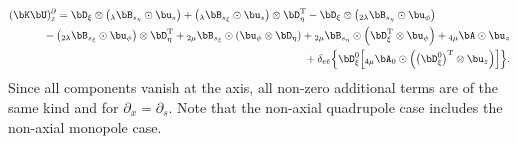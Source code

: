 %
\begin{eqnarray}
\lefteqn{(\bK\bU)_z^{\partial} =
\bD_\xi\otimes\left({}_{\lambda}\bB_{s_\eta}\odot{\bu_s}\right)+
\left({}_{\lambda}\bB_{s_\xi}\odot{\bu_s}\right)\otimes\bD^{\rm{T}}_\eta-
\bD_\xi\otimes\left({}_{2\lambda}\bB_{s_\eta}\odot{\bu_\phi}\right)}
\nonumber\\&&\mbox{}\hspace{2.2em}
-\left({}_{2\lambda}\bB_{s_\xi}\odot{\bu_\phi}\right)\otimes\bD^{\rm{T}}_\eta
+{}_{2\mu}\bB_{s_\xi}\odot\left(\bu_\phi\otimes\bD_\eta\right)+
{}_{2\mu}\bB_{s_\eta}\odot\left(\bD^{\rm{T}}_\xi\otimes \bu_\phi\right)+
{}_{4\mu}\bA\odot \bu_z 
\nonumber\\&&\mbox{}\hspace{2.2em}
+\delta_{e\bar{e}}\Bigl\{
\bD^0_\xi\Bigl[{}_{4\mu}{\bA_0}\odot\left(\left(\bD^0_\xi\right)^{\rm{T}}\otimes 
\bu_z\right)\Bigr]\Bigr\}.
\end{eqnarray}
%
Since all components vanish at the axis, all non-zero additional terms are of 
the same kind and for $\partial_x=\partial_s$. 
Note that the non-axial quadrupole case includes the non-axial monopole case. 
%
